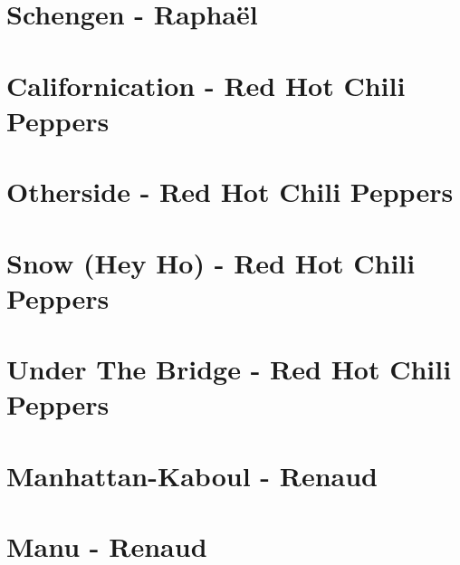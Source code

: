 \documentclass{guitartabs}
\begin{document}
\section{Schengen - Raphaël}
\begin{guitar}

\end{guitar}

\section*{Californication - Red Hot Chili Peppers}
\begin{guitar}

\end{guitar}

\section*{Otherside - Red Hot Chili Peppers}
\begin{guitar}

\end{guitar}

\section{Snow  (Hey Ho) - Red Hot Chili Peppers}
\begin{guitar}

\end{guitar}

\section*{Under The Bridge - Red Hot Chili Peppers}
\begin{guitar}

\end{guitar}



\section{Manhattan-Kaboul - Renaud}
\begin{guitar}

\end{guitar}

\section{Manu - Renaud}
\begin{guitar}

\end{guitar}
\end{document}
